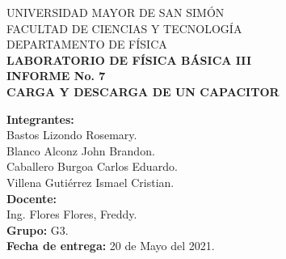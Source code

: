 \documentclass[letter,11pt]{article}
\begin{document}
\begin{titlepage}
\begin{center}
{\Large UNIVERSIDAD MAYOR DE SAN SIMÓN}\\
\vspace*{0.15cm}
{\large FACULTAD DE CIENCIAS Y TECNOLOGÍA}\\
\vspace*{0.10cm}
DEPARTAMENTO DE FÍSICA\\
\vspace*{3.0cm}
{\Large \textbf{LABORATORIO DE FÍSICA BÁSICA III}}\\
\vspace*{0.3cm}
{\Large \textbf{INFORME No. 7}}\\
\vspace*{3.5cm}
{\Large \textbf{CARGA Y DESCARGA DE UN CAPACITOR}}\\
\end{center}

\vspace*{5.8cm}
\leftskip=7.95cm
\noindent
\textbf{Integrantes:}\\
Bastos Lizondo Rosemary.\\
Blanco Alconz John Brandon.\\
Caballero Burgoa Carlos Eduardo.\\
Villena Gutiérrez Ismael Cristian.\\
\newline
\textbf{Docente:}\\
Ing. Flores Flores, Freddy.\\
\newline
\textbf{Grupo:} G3.\\
\textbf{Fecha de entrega:} 20 de Mayo del 2021.\\

\end{titlepage}
\end{document}

